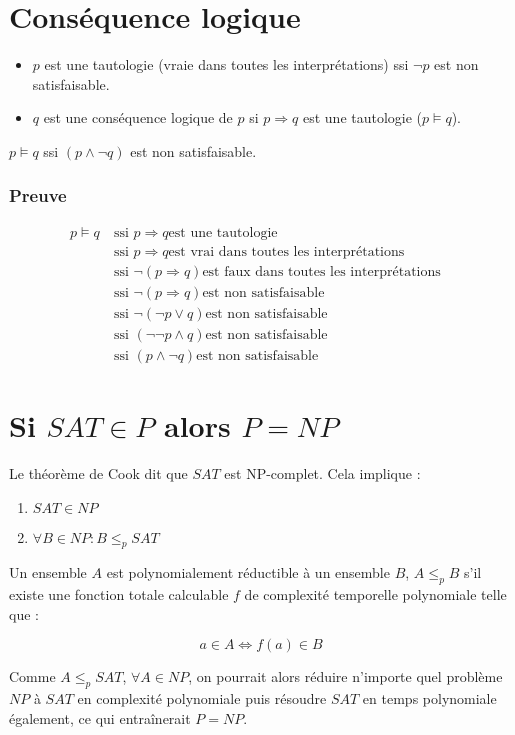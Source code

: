 \newpage
\section{Conséquence logique}

\begin{itemize}
\item $p$ est une tautologie (vraie dans toutes les interprétations) ssi $\neg p$ est non satisfaisable.
\item $q$ est une conséquence logique de $p$ si $p \Rightarrow q$ est une tautologie ($p \models q$).
\end{itemize}

$p \models q$ ssi $(p \wedge \neg q)$ est non satisfaisable.

\subsubsection*{Preuve}

\begin{align*}
p \models q\ &\text{ssi } p \Rightarrow q \text{est une tautologie}& \\
&\text{ssi } p \Rightarrow q \text{est vrai dans toutes les interprétations}& \\
&\text{ssi } \neg(p \Rightarrow q) \text{est faux dans toutes les interprétations}& \\
&\text{ssi } \neg(p \Rightarrow q) \text{est non satisfaisable}& \\
&\text{ssi } \neg(\neg p \vee q) \text{est non satisfaisable}& \\
&\text{ssi } (\neg \neg p \wedge q) \text{est non satisfaisable}& \\
&\text{ssi } (p \wedge \neg q) \text{est non satisfaisable}& 
\end{align*}



\section[P = NP]{Si $SAT \in P$ alors $P = NP$}\label{dem:PNP}

Le théorème de Cook dit que $SAT$ est NP-complet. Cela implique :
\begin{enumerate}
\item $SAT \in NP$
\item $\forall B \in NP : B \leq_p SAT$
\end{enumerate}

Un ensemble $A$ est polynomialement réductible à un ensemble $B$, $A \leq_p B$ s'il existe une fonction totale calculable $f$ de complexité temporelle polynomiale telle que :

\begin{equation*}
a \in A \Leftrightarrow f(a) \in B
\end{equation*}

Comme $A \leq_p SAT$, $\forall A \in NP$, on pourrait alors réduire n'importe quel problème $NP$ à $SAT$ en complexité polynomiale puis résoudre $SAT$ en temps polynomiale également, ce qui entraînerait $P = NP$.

\label{lastpage}
